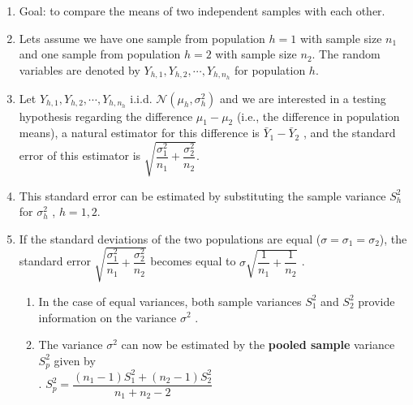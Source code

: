 \begin{enumerate}
    \item Goal: to compare the means of two independent samples with each other.
    \hfill \cite{statistics/book/Statistics-for-Data-Scientists/Maurits-Kaptein}

    \item Lets assume we have one sample from population $h = 1$ with sample size $n_1$ and one sample from population $h = 2$ with sample size $n_2 $. 
    The random variables are denoted by $Y _{h,1} , Y _{h,2}, \cdots , Y _{h,n _h}$ for population $h$. 
    
    \item Let $Y _{h,1} , Y _{h,2}, \cdots , Y _{h,n _h}$ i.i.d. $\mathcal{N} (\mu_h , \sigma^2_ h )$ and we are interested in a testing hypothesis regarding the difference $\mu_1 - \mu_2$ (i.e., the difference in population means), a natural estimator for this difference is $\bar{Y}_1 - \bar{Y}_2$ , and the standard error of this estimator is $\sqrt{\dfrac{\sigma^2 _1 }{n_1} + \dfrac{\sigma^2_ 2 }{n_2} }$.
    \hfill \cite{statistics/book/Statistics-for-Data-Scientists/Maurits-Kaptein}

    \item This standard error can be estimated by substituting the sample variance $S^2 _h$ for $\sigma^2 _h$ , $h = 1, 2$.
    \hfill \cite{statistics/book/Statistics-for-Data-Scientists/Maurits-Kaptein}

    \item If the standard deviations of the two populations are equal ($\sigma = \sigma_1 = \sigma_2$), the standard error $\sqrt{\dfrac{\sigma^2 _1 }{n_1} + \dfrac{\sigma^2_ 2 }{n_2} }$ becomes equal to $\sigma\sqrt{\dfrac{1}{n_1} + \dfrac{1}{n_2}}$ .
    \hfill \cite{statistics/book/Statistics-for-Data-Scientists/Maurits-Kaptein}
    \begin{enumerate}
        \item  In the case of equal variances, both sample variances $S^2 _1$ and $S^2 _2$ provide information on the variance $\sigma^2$ .
        \hfill \cite{statistics/book/Statistics-for-Data-Scientists/Maurits-Kaptein}
    
        \item The variance $\sigma^2$ can now be estimated by the \textbf{pooled sample} variance $S^2 _p$ given by
        \hfill \cite{statistics/book/Statistics-for-Data-Scientists/Maurits-Kaptein}
        \\[0.2cm]
        .\hfill
        $
            S^2_p = \dfrac{(n_1 - 1)S^2_1 + (n_2 - 1)S^2 _2}{n_1 + n_2 - 2}
        $
        \hfill \cite{statistics/book/Statistics-for-Data-Scientists/Maurits-Kaptein}
        

\end{enumerate}
\end{enumerate}
